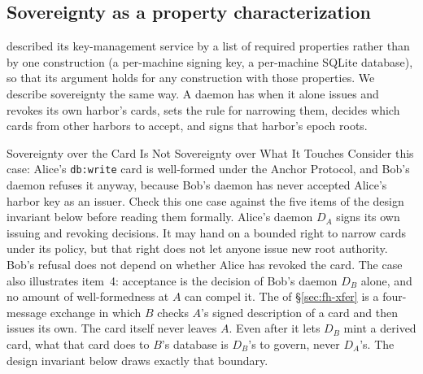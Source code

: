 \documentclass[11pt,a4paper]{article}
\theoremstyle{definition}
\theoremstyle{remark}
\begin{document}
\subsection{Sovereignty as a property \mbox{characterization}}\label{sec:fh-sovereignty}
 described its key-management service by a list of required properties rather than by one construction (a per-machine signing key, a per-machine SQLite database), so that its argument holds for any construction with those properties. We describe sovereignty the same way. A daemon has  when it alone issues and revokes its own harbor's cards, sets the rule for narrowing them, decides which cards from other harbors to accept, and signs that harbor's epoch roots.
\begin{pdexample}{Sovereignty over the Card Is Not Sovereignty over What It Touches}
\setlength{\parskip}{4pt plus 1pt}
%
Consider this case: Alice's \texttt{db:write} card is well-formed under the Anchor Protocol, and Bob's daemon refuses it anyway, because Bob's daemon has never accepted Alice's harbor key as an issuer. Check this one case against the five items of the design invariant below before reading them formally.
Alice's daemon $D_A$ signs its own issuing and revoking decisions. It may
hand on a bounded right to narrow cards under its policy, but that right
does not let anyone issue new root authority. Bob's refusal does not depend
on whether Alice has revoked the card.
The case also illustrates item~4: acceptance is the decision of Bob's daemon $D_B$ alone, and no amount of well-formedness at $A$ can compel it.
The  of \S\ref{sec:fh-xfer} is a four-message exchange in which $B$ checks $A$'s signed description of a card and then issues its own. The card itself never leaves $A$. Even after it lets $D_B$ mint a derived card, what that card does to $B$'s database is $D_B$'s to govern, never $D_A$'s. The design invariant below draws exactly that boundary.
\end{pdexample}
\end{document}
